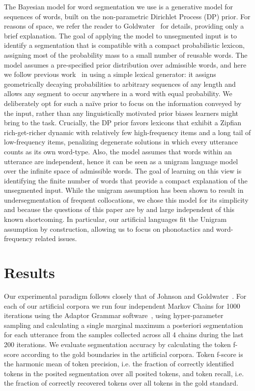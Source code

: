 \documentclass[11pt]{article}
\begin{document}
The Bayesian model for word segmentation we use is a generative model for sequences of words, built on the non-parametric Dirichlet Process (DP) prior. For reasons of space, we refer the reader to Goldwater~ for details, providing only a brief explanation. The goal of applying the model to unsegmented input is to identify a segmentation that is compatible with a compact probabilistic lexicon, assigning most of the probability mass to a small number of reusable words. The model assumes a pre-specified prior distribution over admissible words, and here we follow previous work~\cite{Brent99a,Goldwater07c} in using a simple lexical generator: it assigns geometrically decaying probabilities to arbitrary sequences of any length and allows any segment to occur anywhere in a word with equal probability. We deliberately opt for such a na\"{i}ve prior to focus on the information conveyed by the input, rather than any linguistically motivated prior biases learners might bring to the task. Crucially, the DP prior favors lexicons that exhibit a Zipfian rich-get-richer dynamic with relatively few high-frequency items and a long tail of low-frequency items, penalizing degenerate solutions in which every utterance counts as its own word-type. Also, the model assumes that words within an utterance are independent, hence it can be seen as a unigram language model over the infinite space of admissible words. The goal of learning on this view is identifying the finite number of words that provide a compact explanation of the unsegmented input. While the unigram assumption has been shown to result in undersegmentation of frequent collocations, we chose this model for its simplicity and because the questions of this paper are by and large independent of this known shortcoming. In particular, our artificial languages fit the Unigram assumption by construction, allowing us to focus on phonotactics and word-frequency related issues.

\section{Results}
\vspace*{-5pt}
Our experimental paradigm follows closely that of Johnson and Goldwater~. For each of our artificial corpora we run four independent Markov Chains for 1000 iterations using the Adaptor Grammar software~\cite{Johnson07c}, using hyper-parameter sampling and calculating a single marginal maximum a posteriori segmentation for each utterance from the samples collected across all 4 chains during the last 200 iterations. We evaluate segmentation accuracy by calculating the token f-score according to the gold boundaries in the artificial corpora. Token f-score is the harmonic mean of token precision, i.e. the fraction of correctly identified tokens in the posited segmentation over all posited tokens, and token recall, i.e. the fraction of correctly recovered tokens over all tokens in the gold standard. 
\end{document}
